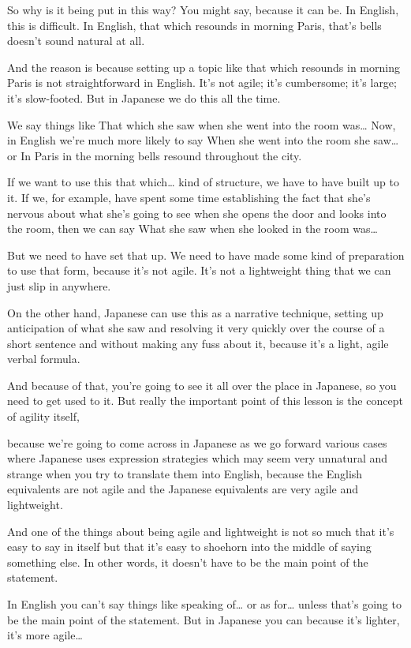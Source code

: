 So why is it being put in this way? You might say, because it can be. In English, this is difficult. In English, that which resounds in morning Paris, that's bells doesn't sound natural at all.

And the reason is because setting up a topic like that which resounds in morning Paris is not straightforward in English. It's not agile; it's cumbersome; it's large; it's slow-footed. But in Japanese we do this all the time.

We say things like That which she saw when she went into the room was\ldots{} Now, in English we're much more likely to say When she went into the room she saw\ldots{} or In Paris in the morning bells resound throughout the city.

If we want to use this that which\ldots{} kind of structure, we have to have built up to it. If we, for example, have spent some time establishing the fact that she's nervous about what she's going to see when she opens the door and looks into the room, then we can say What she saw when she looked in the room was\ldots{}

But we need to have set that up. We need to have made some kind of preparation to use that form, because it's not agile. It's not a lightweight thing that we can just slip in anywhere.

On the other hand, Japanese can use this as a narrative technique, setting up anticipation of what she saw and resolving it very quickly over the course of a short sentence and without making any fuss about it, because it's a light, agile verbal formula.

And because of that, you're going to see it all over the place in Japanese, so you need to get used to it. But really the important point of this lesson is the concept of agility itself,

{}

because we're going to come across in Japanese as we go forward various cases where Japanese uses expression strategies which may seem very unnatural and strange when you try to translate them into English, because the English equivalents are not agile and the Japanese equivalents are very agile and lightweight.

And one of the things about being agile and lightweight is not so much that it's easy to say in itself but that it's easy to shoehorn into the middle of saying something else. In other words, it doesn't have to be the main point of the statement.

In English you can't say things like speaking of\ldots{} or as for\ldots{} unless that's going to be the main point of the statement. But in Japanese you can because it's lighter, it's more agile\ldots{}

\stopsectionlevel

\stopsectionlevel
